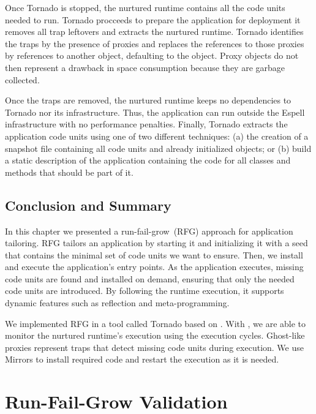 Once Tornado is stopped, the nurtured runtime contains all the code units needed to run. Tornado procceeds to prepare the application for deployment \ie it removes all trap leftovers and extracts the nurtured runtime. Tornado identifies the traps by the presence of proxies and replaces the references to those proxies by references to another object, defaulting to the  object. Proxy objects do not then represent a drawback in space consumption because they are garbage collected. %

Once the traps are removed, the nurtured runtime keeps no dependencies to Tornado nor its infrastructure. Thus, the application can run outside the Espell infrastructure with no performance penalties. Finally, Tornado extracts the application code units using one of two different techniques: (a) the creation of a snapshot file containing all code units and already initialized objects; or (b) build a static description of the application containing the code for all classes and methods that should be part of it.

\section{Conclusion and Summary}

In this chapter we presented a run-fail-grow~(RFG) approach for application tailoring. RFG tailors an application by starting it and initializing it with a seed that contains the minimal set of code units we want to ensure. Then, we install and execute the application's entry points. As the application executes, missing code units are found and installed on demand, ensuring that only the needed code units are introduced. By following the runtime execution, it supports dynamic features such as reflection and meta-programming.

We implemented RFG in a tool called Tornado based on \Vtt. With \Vtt, we are able to monitor the nurtured runtime's execution using the execution cycles. Ghost-like proxies represent traps that detect missing code units during execution. We use Mirrors to install required code and restart the execution as it is needed.

\chapter{Run-Fail-Grow Validation}
\minitoc
\introduction

